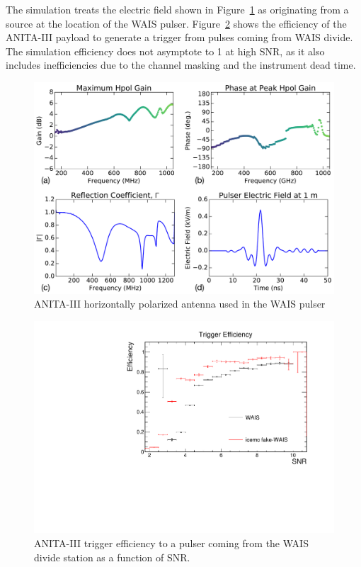 The simulation treats the electric field shown in Figure~\ref{fig:waisPulser} as originating from a source at the location of the WAIS pulser. Figure~\ref{fig:waisEff} shows the efficiency of the ANITA-III payload to generate a trigger from pulses coming from WAIS divide. The simulation efficiency does not asymptote to 1 at high SNR, as it also includes inefficiencies due to the channel masking and the instrument dead time. 

\begin{figure}
\centering
\includegraphics[width=\linewidth]{./Figs/waisPulser.pdf}
\caption{ANITA-III horizontally polarized antenna used in the WAIS pulser}
\label{fig:waisPulser}
\end{figure}

\begin{figure}
\centering
\includegraphics[width=.5\linewidth]{./Figs/Efficiency_WAIS.pdf}
\caption{ANITA-III trigger efficiency to a pulser coming from the WAIS divide station as a function of SNR.}
\label{fig:waisEff}
\end{figure}

